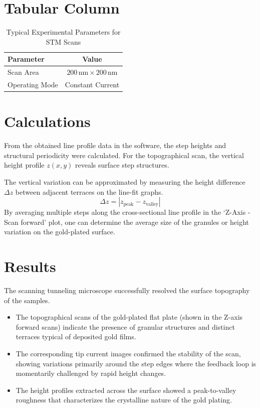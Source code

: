 \documentclass[12pt, a4paper]{article}
\begin{document}
\section{Tabular Column}
\begin{table}[H]
    \centering
    \caption{Typical Experimental Parameters for STM Scans}
    \begin{tabular}{@{}lc@{}}
        \toprule
        \textbf{Parameter} & \textbf{Value} \\
        \midrule
        Scan Area & $200\,\text{nm} \times 200\,\text{nm}$ \\
        Operating Mode & Constant Current \\
        \bottomrule
    \end{tabular}
\end{table}

\section{Calculations}
From the obtained line profile data in the software, the step heights and structural periodicity were calculated. For the topographical scan, the vertical height profile $z(x,y)$ reveals surface step structures. 

The vertical variation can be approximated by measuring the height difference $\Delta z$ between adjacent terraces on the line-fit graphs. 
\begin{equation}
\Delta z = |z_{\text{peak}} - z_{\text{valley}}|
\end{equation}
By averaging multiple steps along the cross-sectional line profile in the `Z-Axis - Scan forward' plot, one can determine the average size of the granules or height variation on the gold-plated surface.

\section{Results}
The scanning tunneling microscope successfully resolved the surface topography of the samples. 
\begin{itemize}
    \item The topographical scans of the gold-plated flat plate (shown in the Z-axis forward scans) indicate the presence of granular structures and distinct terraces typical of deposited gold films.
    \item The corresponding tip current images confirmed the stability of the scan, showing variations primarily around the step edges where the feedback loop is momentarily challenged by rapid height changes.
    \item The height profiles extracted across the surface showed a peak-to-valley roughness that characterizes the crystalline nature of the gold plating.
\end{itemize}
\end{document}
